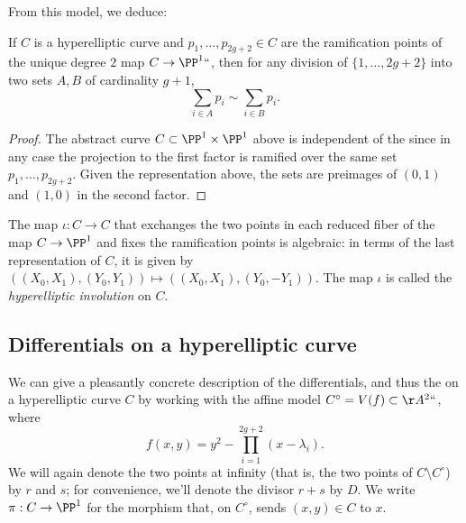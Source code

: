 From this model, we deduce:

\begin{corollary}
\label{relation on ramification points}
If $C$ is a hyperelliptic curve  and $p_1,\dots,p_{2g+2} \in C$ are the
ramification points of the unique degree $2$ map $C \to \PP^1` `$, then for any
division of $\{1,\dots,2g+2\}$ into two sets $A,B$ of cardinality $g+1$,
$$
\sum_{i\in A} p_{i}   \sim  \sum_{i\in B}p_{i}.
$$
\end{corollary}

\begin{proof}
The abstract curve $C\subset \PP^{1}\times \PP^{1}$ above
is independent of the
since in any case the projection to the
first factor
is ramified over the same set $p_{1}, \dots, p_{2g+2}$. Given the
representation above, the sets
are
preimages of $(0,1)$ and
$(1,0)$ in the second factor.
\end{proof}

 The map $\iota : C \to C$ that exchanges the two points in each reduced
 fiber of the map $C \to \PP^1$ and fixes the ramification points is
 algebraic: in terms of the last representation of $C$, it is given by
 $((X_0,X_1), (Y_0,Y_1)) \mapsto  ((X_0,X_1), (Y_0,-Y_1)) $. The map
%
%
 $\iota$ is called the \emph{hyperelliptic involution} on $C$.

\subsection*{Differentials on a hyperelliptic curve}

We can give a pleasantly concrete \null description of the differentials,
and thus the
%
on a hyperelliptic curve $C$
by working with the affine model $C^\circ = V(f) \subset \AA^2` `$, where
$$
f(x,y) = y^2 - \prod_{i=1}^{2g+2} (x - \lambda_i).
$$
We will again denote the two points at infinity (that is, the two points
of $C \setminus C^\circ$) by $r$ and $s$; for convenience, we'll denote
the divisor $r+s$ by $D$. We write $\pi:C \to \PP^1$ for the morphism
that, on $C^\circ$, sends $(x,y) \in C$ to $x$.

